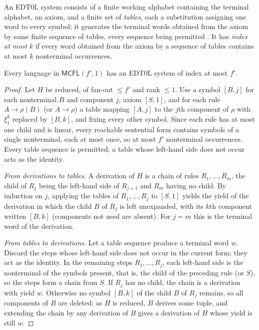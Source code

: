 An EDT0L system consists of a finite working alphabet containing the
terminal alphabet, an axiom, and a finite set of \emph{tables}, each a
substitution assigning one word to every symbol; it generates the terminal
words obtained from the axiom by some finite sequence of tables, every
sequence being permitted \cite[Definition~37]{Gallot2021}.  It has
\emph{index at most $k$} if every word obtained from the axiom by a sequence
of tables contains at most $k$ nonterminal occurrences.

\begin{lemma}
\label{lem:rank-one-edt0l}
Every language in $\mathsf{MCFL}(f',1)$ has an EDT0L system of index at most $f'$.
\end{lemma}

\begin{proof}
Let $H$ be reduced, of fan-out $\le f'$ and rank $\le1$.  Use a symbol $[B,j]$ for each
nonterminal $B$ and component $j$, axiom $[S,1]$, and for each rule $A\to\rho(B)$ (or
$A\to\rho$) a table mapping $[A,j]$ to the $j$th component of $\rho$ with $\xi_1^k$
replaced by $[B,k]$, and fixing every other symbol.  Since each rule has at most one
child and is linear, every reachable sentential form contains symbols of a single
nonterminal, each at most once, so at most $f'$ nonterminal occurrences.  Every
table sequence is permitted; a table whose left-hand side does not occur acts as the
identity.

\emph{From derivations to tables.}  A derivation of $H$ is a chain of rules
$R_1,\ldots,R_m$, the child of $R_j$ being the left-hand side of $R_{j+1}$ and $R_m$
having no child.  By induction on $j$, applying the tables of $R_1,\ldots,R_j$ to
$[S,1]$ yields the yield of the derivation in which the child $B$ of $R_j$ is left
unexpanded, with its $k$th component written $[B,k]$ (components not used are
absent).  For $j=m$ this is the terminal word of the derivation.

\emph{From tables to derivations.}  Let a table sequence produce a terminal word $w$.
Discard the steps whose left-hand side does not occur in the current form; they act
as the identity.  In the remaining steps $R_1,\ldots,R_j$, each left-hand side is the
nonterminal of the symbols present, that is, the child of the preceding rule (or $S$),
so the steps form a chain from $S$.  If $R_j$ has no child, the chain is a
derivation with yield $w$.  Otherwise no symbol $[B,k]$ of the child $B$ of $R_j$
remains, so all components of $B$ are deleted; as $H$ is reduced, $B$ derives some
tuple, and extending the chain by any derivation of $B$ gives a derivation of $H$
whose yield is still $w$.
\end{proof}

